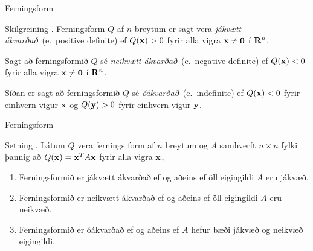 \begin{frame}{Ferningsform} 

\begin {block}{Skilgreining \kaflanr.}
Ferningsform $Q$ af $n$-breytum er sagt vera
{\em \color{red} jákvætt ákvarðað}\  (e.~positive definite) ef $Q(\mbox{${\bf x}$})>0$ fyrir
alla vigra $\mbox{${\bf x}$}\neq \mbox{${\bf 0}$}$ í $\mbox{${\bf R}^n$}$.   

\medskip
Sagt að ferningsformið $Q$ sé
{\em \color{red} neikvætt ákvarðað}\  (e.~negative definite) ef $Q(\mbox{${\bf x}$})<0$ fyrir
alla vigra $\mbox{${\bf x}$}\neq \mbox{${\bf 0}$}$ í $\mbox{${\bf R}^n$}$.   

\medskip
Síðan er sagt að ferningsformið $Q$ sé
{\em  \color{red} óákvarðað}\  (e.~indefinite) ef $Q(\mbox{${\bf x}$})<0$ fyrir
einhvern vigur $\mbox{${\bf x}$}$  og $Q(\mbox{${\bf y}$})>0$ fyrir einhvern vigur
$\mbox{${\bf y}$}$. 
\end{block}

\end{frame}


\begin{frame}{Ferningsform} 

\begin {block}{Setning \kaflanr.}
 Látum $Q$ vera fernings form  af $n$ breytum og
$A$ samhverft $n\times n$ fylki þannig að $Q(\mbox{${\bf x}$})=\mbox{${\bf x}$}^TA\mbox{${\bf x}$}$ fyrir
alla vigra $\mbox{${\bf x}$}$,
\begin {enumerate}
 \item  Ferningsformið er jákvætt ákvarðað ef og aðeins ef öll eigingildi
    $A$ eru jákvæð.
\item Ferningsformið er neikvætt ákvarðað ef og aðeins ef öll eigingildi
    $A$ eru neikvæð.
\item  Ferningsformið er óákvarðað ef og aðeins ef $A$ hefur bæði jákvæð
     og neikvæð eigingildi.	
\end {enumerate}

\end{block}

\end{frame}



